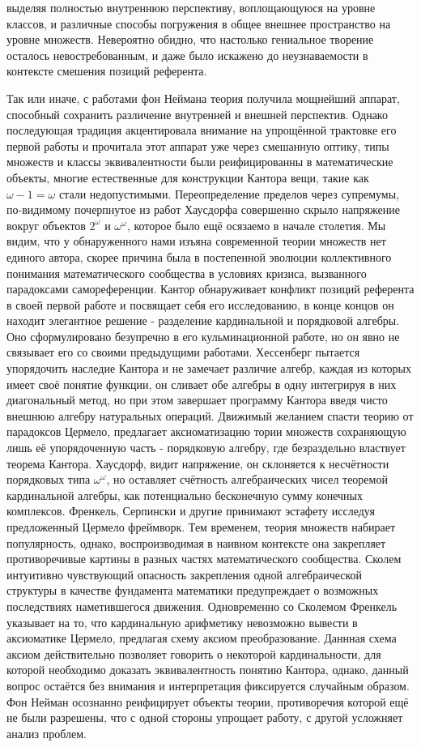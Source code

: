 \documentclass[12pt]{article}
\begin{document}
выделяя полностью внутреннюю перспективу, воплощающуюся на уровне классов, и различные способы погружения в общее внешнее пространство на уровне множеств. Невероятно обидно, что настолько гениальное творение осталось невостребованным, и даже было искажено до неузнаваемости в контексте смешения позиций референта.

Так или иначе, с работами фон Неймана теория получила мощнейший аппарат, способный сохранить различение внутренней и внешней перспектив. Однако последующая традиция акцентировала внимание на упрощённой трактовке его первой работы и прочитала этот аппарат уже через смешанную оптику, типы множеств и классы эквивалентности были реифицированны в математические объекты, многие естественные для конструкции Кантора вещи, такие как $\omega - 1 = \omega$ стали недопустимыми. Переопределение пределов через супремумы, по-видимому почерпнутое из работ Хаусдорфа совершенно скрыло напряжение вокруг объектов $2^{\omega}$ и $\omega^{\omega}$, которое было ещё осязаемо в начале столетия. Мы видим, что у обнаруженного нами изъяна современной теории множеств нет единого автора, скорее причина была в постепенной эволюции коллективного понимания математического сообщества в условиях кризиса, вызванного парадоксами самореференции. Кантор обнаруживает конфликт позиций референта в своей первой работе и посвящает себя его исследованию, в конце концов он находит элегантное решение - разделение кардинальной и порядковой алгебры. Оно сформулировано безупречно в его кульминационной работе, но он явно не связывает его со своими предыдущими работами. Хессенберг пытается упорядочить наследие Кантора и не замечает различие алгебр, каждая из которых имеет своё понятие функции, он сливает обе алгебры в одну интегрируя в них диагональный метод, но при этом завершает программу Кантора введя чисто внешнюю алгебру натуральных операций. Движимый желанием спасти теорию от парадоксов Цермело, предлагает аксиоматизацию тории множеств сохраняющую лишь её упорядоченную часть - порядковую алгебру, где безраздельно властвует теорема Кантора. Хаусдорф, видит напряжение, он склоняется к несчётности порядковых типа $\omega^{\omega}$, но оставляет счётность алгебраических чисел теоремой кардинальной алгебры, как потенциально бесконечную сумму конечных комплексов. Френкель, Серпински и другие принимают эстафету исследуя предложенный Цермело фреймворк. Тем временем, теория множеств набирает популярность, однако, воспроизводимая в наивном контексте она закрепляет противоречивые картины в разных частях математического сообщества. Сколем интуитивно чувствующий опасность закрепления одной алгебраической структуры в качестве фундамента математики предупреждает о возможных последствиях наметившегося движения. Одновременно со Сколемом Френкель указывает на то, что кардинальную арифметику невозможно вывести в аксиоматике Цермело, предлагая схему аксиом преобразование. Даннная схема аксиом действительно позволяет говорить о некоторой кардинальности, для которой необходимо доказать эквивалентность понятию Кантора, однако, данный вопрос остаётся без внимания и интерпретация фиксируется случайным образом. Фон Нейман осознанно реифицирует объекты теории, противоречия которой ещё не были разрешены, что с одной стороны упрощает работу, с другой усложняет анализ проблем. 
\end{document}

